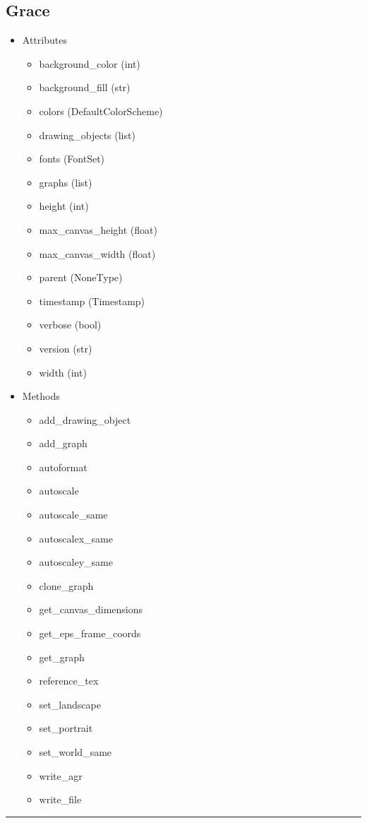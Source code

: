 \documentclass[10pt]{article}
\begin{document}
\begin{multicols}{4}
\subsection*{\footnotesize Grace}
\begin{itemize}
\item Attributes
\begin{itemize}
\item background\_color (int)
\item background\_fill (str)
\item colors (DefaultColorScheme)
\item drawing\_objects (list)
\item fonts (FontSet)
\item graphs (list)
\item height (int)
\item max\_canvas\_height (float)
\item max\_canvas\_width (float)
\item parent (NoneType)
\item timestamp (Timestamp)
\item verbose (bool)
\item version (str)
\item width (int)
\end{itemize}
\item Methods
\begin{itemize}
\item add\_drawing\_object
\item add\_graph
\item autoformat
\item autoscale
\item autoscale\_same
\item autoscalex\_same
\item autoscaley\_same
\item clone\_graph
\item get\_canvas\_dimensions
\item get\_eps\_frame\_coords
\item get\_graph
\item reference\_tex
\item set\_landscape
\item set\_portrait
\item set\_world\_same
\item write\_agr
\item write\_file
\end{itemize}
\end{itemize}
\vspace{0.5em}
\hrule
\vspace{0.1em}

\end{multicols}
\end{document}
